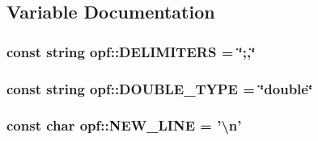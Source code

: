 \subsection{Variable Documentation}
\hypertarget{namespaceopf_ae15591d0357a37e20eb0fefe5788dfd8}{
\subsubsection[{D\+E\+L\+I\+M\+I\+T\+E\+R\+S}]{\setlength{\rightskip}{0pt plus 5cm}const string opf\+::\+D\+E\+L\+I\+M\+I\+T\+E\+R\+S = \char`\"{};,\char`\"{}}}\label{namespaceopf_ae15591d0357a37e20eb0fefe5788dfd8}
\hypertarget{namespaceopf_ae9f8261bcfab62d67f9532d544265859}{
\subsubsection[{D\+O\+U\+B\+L\+E\+\_\+\+T\+Y\+P\+E}]{\setlength{\rightskip}{0pt plus 5cm}const string opf\+::\+D\+O\+U\+B\+L\+E\+\_\+\+T\+Y\+P\+E = \char`\"{}double\char`\"{}}}\label{namespaceopf_ae9f8261bcfab62d67f9532d544265859}
\hypertarget{namespaceopf_a2b1f54bbedca5f63be8b631958338bb3}{
\subsubsection[{N\+E\+W\+\_\+\+L\+I\+N\+E}]{\setlength{\rightskip}{0pt plus 5cm}const char opf\+::\+N\+E\+W\+\_\+\+L\+I\+N\+E = '\textbackslash{}n'}}\label{namespaceopf_a2b1f54bbedca5f63be8b631958338bb3}
